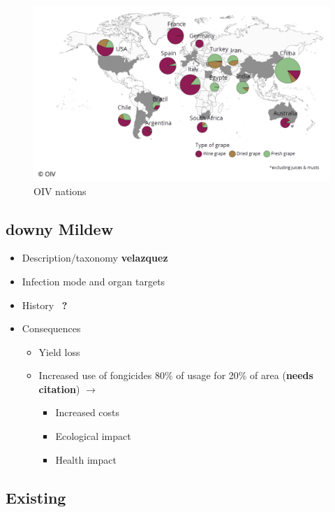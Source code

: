 \documentclass[english]{article}
\begin{document}
\begin{figure}[H]
	\begin{center}
		\includegraphics[width=0.7\linewidth]{2023_cdt_oiv_world.png}
		\caption{OIV nations}\label{fig:oivworld}
	\end{center}
\end{figure}

\subsection{downy Mildew}

\begin{itemize}
	\item Description/taxonomy \textbf{velazquez}
	\item Infection mode and organ targets
	\item History~\parencite{fontaineEuropeBridgeheadWorldwide2021} \textbf{?}
	\item Consequences
	      \begin{itemize}
		      \item Yield loss
		      \item Increased use of fongicides 80\% of usage for 20\% of area (\textbf{needs citation}) $\rightarrow$
		            \begin{itemize}
			            \item Increased costs
			            \item Ecological impact
			            \item Health impact
		            \end{itemize}
	      \end{itemize}
\end{itemize}

\subsection{Existing}
\end{document}

